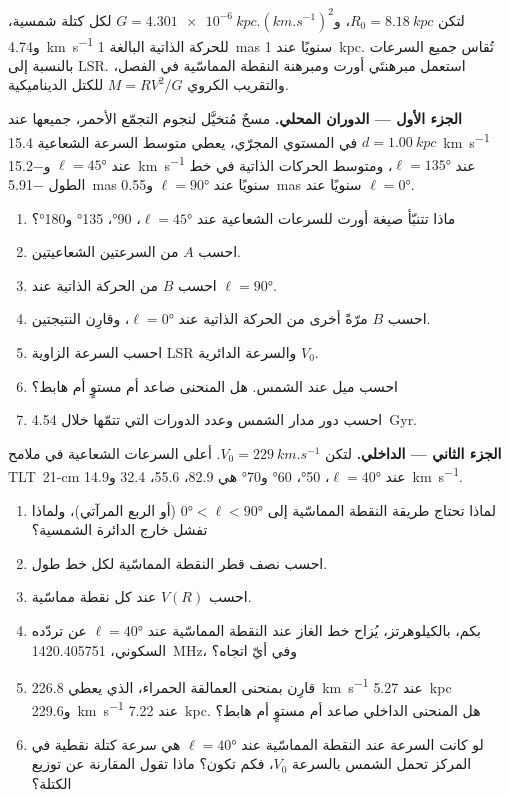 \begin{problem}
\label{pb:b3:milky-way-galaxies:1}
لتكن $R_0 = \qty{8.18}{kpc}$، و$G = \qty{4.301e-6}{kpc.(km.s^{-1})^2}$ لكل
كتلة شمسية، و\qty{4.74}{km.s^{-1}} للحركة الذاتية البالغة
\qty{1}{mas} سنويًا عند \qty{1}{kpc}. تُقاس جميع السرعات بالنسبة إلى
LSR. استعمل مبرهنتَي أورت ومبرهنة النقطة المماسّية في الفصل، والتقريب
الكروي $M = RV^2/G$ للكتل الديناميكية.

\medskip\noindent\textbf{الجزء الأول --- الدوران المحلي.} مسحٌ مُتخيَّل
لنجوم التجمّع الأحمر، جميعها عند $d = \qty{1.00}{kpc}$ في المستوي
المجرّي، يعطي متوسط السرعة الشعاعية \qty{+15.4}{km.s^{-1}} عند
$\ell = \ang{45}$ و\qty{-15.2}{km.s^{-1}} عند $\ell = \ang{135}$،
ومتوسط الحركات الذاتية في خط الطول \qty{-5.91}{mas} سنويًا عند
$\ell = \ang{90}$ و\qty{+0.55}{mas} سنويًا عند $\ell = \ang{0}$.
\begin{enumerate}
\item ماذا تتنبّأ صيغة أورت للسرعات الشعاعية عند
  $\ell = \ang{45}$، \ang{90}، \ang{135} و\ang{180}؟
\item احسب $A$ من السرعتين الشعاعيتين.
\item احسب $B$ من الحركة الذاتية عند $\ell = \ang{90}$.
\item احسب $B$ مرّةً أخرى من الحركة الذاتية عند $\ell = \ang{0}$،
  وقارِن النتيجتين.
\item احسب السرعة الزاوية  LSR والسرعة الدائرية
  $V_0$.
\item احسب ميل  عند الشمس. هل المنحنى
  صاعد أم مستوٍ أم هابط؟
\item احسب دور مدار الشمس وعدد الدورات التي تتمّها
  خلال \qty{4.54}{Gyr}.
\end{enumerate}

\medskip\noindent\textbf{الجزء الثاني ---  الداخلي.} لتكن
$V_0 = \qty{229}{km.s^{-1}}$. أعلى السرعات الشعاعية في
ملامح \mbox{\textdir TLT 21-cm} عند $\ell = \ang{40}$، \ang{50}، \ang{60} و\ang{70} هي
82.9، 55.6، 32.4 و\qty{14.9}{km.s^{-1}}.
\begin{enumerate}[resume]
\item لماذا تحتاج طريقة النقطة المماسّية إلى $\ang{0} < \ell < \ang{90}$
  (أو الربع المرآتي)، ولماذا تفشل خارج الدائرة الشمسية؟
\item احسب نصف قطر النقطة المماسّية لكل خط طول.
\item احسب $V(R)$ عند كل نقطة مماسّية.
\item بكم، بالكيلوهرتز، يُزاح خط الغاز عند النقطة المماسّية
  عند $\ell = \ang{40}$ عن تردّده السكوني،
  \qty{1420.405751}{MHz}، وفي أيّ اتجاه؟
\item قارِن بمنحنى العمالقة الحمراء، الذي يعطي \qty{226.8}{km.s^{-1}}
  عند \qty{5.27}{kpc} و\qty{229.6}{km.s^{-1}} عند \qty{7.22}{kpc}. هل
  المنحنى الداخلي صاعد أم مستوٍ أم هابط؟
\item لو كانت السرعة عند النقطة المماسّية عند $\ell = \ang{40}$ هي سرعة
  كتلة نقطية في المركز تحمل الشمس بالسرعة $V_0$، فكم تكون؟
  ماذا تقول المقارنة عن توزيع الكتلة؟
\end{enumerate}


\end{problem}
